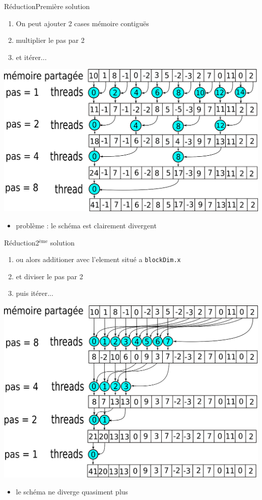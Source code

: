 \documentclass[11pt,mathserif]{beamer}
\newcommand{\pozik}{\faSmileO}
\newcommand{\triste}{\faFrownO}
\newcommand{\harritu}{\faExclamation}
\begin{document}
\begin{frame}{Réduction}{Première solution}
 \begin{enumerate}[<+->]
   \item On peut ajouter 2 cases mémoire contiguës
   \item multiplier le pas par 2
   \item et itérer...
  \end{enumerate}
\pause
\begin{center}
  \includegraphics[width=0.8\linewidth]{fig/divergent.eps}
\end{center}
\pause
\begin{itemize}
  \item[\triste] problème : le schéma est clairement divergent \harritu
  \end{itemize}
\end{frame}

\begin{frame}{Réduction}{2$^{\mbox{ème}}$ solution}
 \begin{enumerate}[<+->]
   \item ou alors additioner avec l'element situé a {\tt blockDim.x}
   \item et diviser le pas par 2
   \item puis itérer...
  \end{enumerate}
\pause
\begin{center}
  \includegraphics[width=0.6\linewidth]{fig/convergent.eps}
\end{center}
\pause
\begin{itemize}
  \item[\pozik] le schéma ne diverge quasiment plus \harritu
  \end{itemize}
\end{frame}
\end{document}
